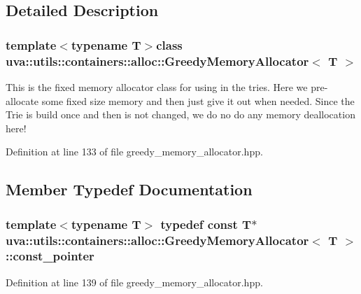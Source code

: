 \subsection{Detailed Description}
\subsubsection*{template$<$typename T$>$class uva\+::utils\+::containers\+::alloc\+::\+Greedy\+Memory\+Allocator$<$ T $>$}

This is the fixed memory allocator class for using in the tries. Here we pre-\/allocate some fixed size memory and then just give it out when needed. Since the Trie is build once and then is not changed, we do no do any memory deallocation here! 

Definition at line 133 of file greedy\+\_\+memory\+\_\+allocator.\+hpp.



\subsection{Member Typedef Documentation}
\hypertarget{classuva_1_1utils_1_1containers_1_1alloc_1_1_greedy_memory_allocator_a206c9d79b70e9935b7de841ceb45ab7f}{}
\subsubsection[{const\+\_\+pointer}]{\setlength{\rightskip}{0pt plus 5cm}template$<$typename T$>$ typedef const T$\ast$ {\bf uva\+::utils\+::containers\+::alloc\+::\+Greedy\+Memory\+Allocator}$<$ T $>$\+::{\bf const\+\_\+pointer}}\label{classuva_1_1utils_1_1containers_1_1alloc_1_1_greedy_memory_allocator_a206c9d79b70e9935b7de841ceb45ab7f}


Definition at line 139 of file greedy\+\_\+memory\+\_\+allocator.\+hpp.

\hypertarget{classuva_1_1utils_1_1containers_1_1alloc_1_1_greedy_memory_allocator_a7911b8e1f044aab418c3b46d6df2f92a}{}
